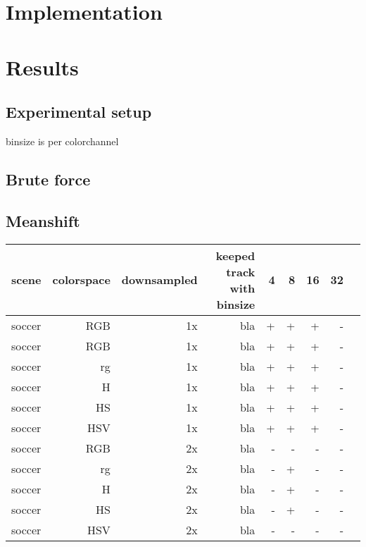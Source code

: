 \documentclass[a4paper,11pt]{article}
\begin{document}

\section{Implementation}

\section{Results} 
	\subsection{Experimental setup} 
	binsize is per colorchannel
	\subsection{Brute force} 
	\subsection{Meanshift} 

	\begin{tabular}{l*{8}{r|}}
		scene	& 	colorspace	& downsampled & keeped track with binsize & 4 & 8 & 16 & 32\\
		\hline
		soccer 	& 	RGB	 		& 1x		  &			bla				  & + & + & +  &  -\\
		soccer 	& 	RGB	 		& 1x		  &			bla				  & + & + & +  &  -\\
		soccer 	& 	rg	 		& 1x 		  &			bla				  & + & + & +  &  -\\
		soccer 	& 	H	 		& 1x		  &			bla				  & + & + & +  &  -\\
		soccer 	& 	HS	 		& 1x		  &			bla				  & + & + & +  &  -\\
		soccer 	& 	HSV	 		& 1x		  &			bla				  & + & + & +  &  -\\
		soccer 	& 	RGB	 		& 2x		  &			bla				  & - & - & -  &  -\\
		soccer 	& 	rg	 		& 2x 		  &			bla				  & - & + & -  &  -\\
		soccer 	& 	H	 		& 2x		  &			bla				  & - & + & -  &  -\\
		soccer 	& 	HS	 		& 2x		  &			bla				  & - & + & -  &  -\\
		soccer 	& 	HSV	 		& 2x		  &			bla				  & - & - & -  &  -\\
	\end{tabular}	
\end{document}

